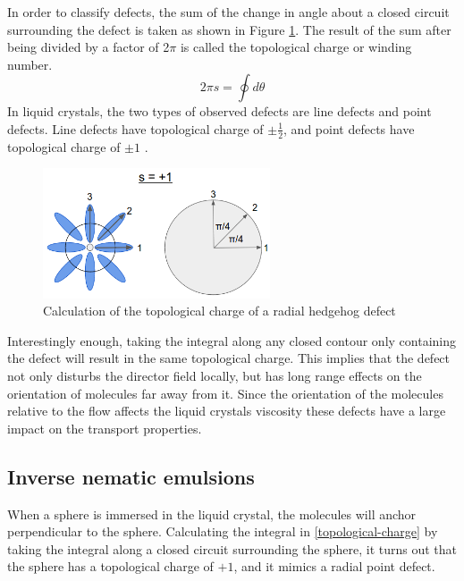 \documentclass[preprint, aps]{revtex4-1}
\begin{document}
In order to classify defects, the sum of the change in angle about a closed 
circuit surrounding the defect is taken as shown in Figure \ref{fig:circuit}. 
The result of the sum after being divided by a factor of 2$\pi$ is called the 
topological charge or winding number.
	\begin{equation} \label{topological-charge}
		2\pi s = \oint d\theta
	\end{equation}
In liquid crystals, the two types of observed defects are line defects and point
defects. Line defects have topological charge of $\pm\frac{1}{2}$, and point 
defects have topological charge of $\pm1$ \cite{lubensky98}. 
	\begin{figure}[H]
		\centering
		\includegraphics[width=0.6\textwidth]{circuit-calc.png}
		\caption{Calculation of the topological charge of a radial hedgehog
		defect}
		\label{fig:circuit}
	\end{figure}
Interestingly enough, taking the integral along any closed contour only 
containing the defect will result in the same topological charge. This implies 
that the defect not only disturbs the director field locally, but has long range
effects on the orientation of molecules far away from it. Since the orientation
of the molecules relative to the flow affects the liquid crystals viscosity 
these defects have a large impact on the transport properties.

\subsection*{Inverse nematic emulsions}
When a sphere is immersed in the liquid crystal, the molecules will anchor 
perpendicular to the sphere. Calculating the integral in 
\ref{topological-charge} by taking the integral along a closed circuit 
surrounding the sphere, it turns out that the sphere has a topological
charge of $+1$, and it mimics a radial point defect.
\end{document}
